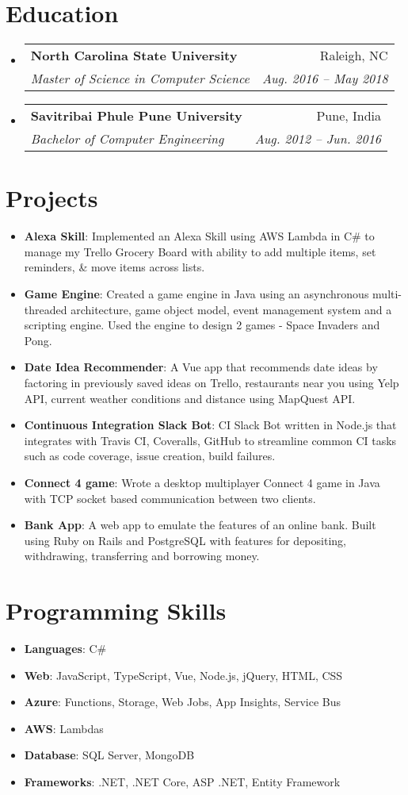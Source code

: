 \documentclass[letterpaper,11pt]{article}
\makeatletter
\newcommand{\resumeItem}[2]{
  \item\small{
    \textbf{#1}{: #2 \vspace{-2pt}}
  }
}
\newcommand{\resumeSubheading}[4]{
  \vspace{-1pt}\item
    \begin{tabular*}{0.97\textwidth}[t]{l@{\extracolsep{\fill}}r}
      \textbf{#1} & #2 \\
      \textit{\small#3} & \textit{\small #4} \\
    \end{tabular*}\vspace{-5pt}
}
\newcommand{\resumeSubItem}[2]{\resumeItem{#1}{#2}\vspace{-4pt}}
\newcommand{\resumeSubHeadingListStart}{\begin{itemize}[leftmargin=*]}
\newcommand{\resumeSubHeadingListEnd}{\end{itemize}}
\makeatother
\begin{document}
\section{Education}
  \resumeSubHeadingListStart
    \resumeSubheading
      {North Carolina State University}{Raleigh, NC}
      {Master of Science in Computer Science}{Aug. 2016 -- May 2018}
    \resumeSubheading
      {Savitribai Phule Pune University}{Pune, India}
      {Bachelor of Computer Engineering}{Aug. 2012 -- Jun. 2016}
  \resumeSubHeadingListEnd


\section{Projects}
  \resumeSubHeadingListStart
    \resumeSubItem{Alexa Skill}
      {Implemented an Alexa Skill using AWS Lambda in C\# to manage my Trello Grocery Board with ability to add multiple items, set reminders, \& move items across lists. }
    \resumeSubItem{Game Engine}
      {Created a game engine in Java using an asynchronous multi-threaded architecture, game object model, event management system and a scripting engine. Used the engine to design 2 games - Space Invaders and Pong.}
    \resumeSubItem{Date Idea Recommender}
      {A Vue app that recommends date ideas by factoring in previously saved ideas on Trello, restaurants near you using Yelp API, current weather conditions and distance using MapQuest API.}
    \resumeSubItem{Continuous Integration Slack Bot}
      {CI Slack Bot written in Node.js that integrates with Travis CI, Coveralls, GitHub to streamline common CI tasks such as code coverage, issue creation, build failures.}
    \resumeSubItem{Connect 4 game}
      {Wrote a desktop multiplayer Connect 4 game in Java with TCP socket based communication between two clients.}
    \resumeSubItem{Bank App}
      {A web app to emulate the features of an online bank. Built using Ruby on Rails and PostgreSQL with features for depositing, withdrawing, transferring and borrowing money.}
  \resumeSubHeadingListEnd

%
\section{Programming Skills}
  \resumeSubHeadingListStart
    \resumeSubItem{Languages}{C\#}
    \resumeSubItem{Web}{JavaScript, TypeScript, Vue, Node.js, jQuery, HTML, CSS}   
    \resumeSubItem{Azure}{Functions, Storage, Web Jobs, App Insights, Service Bus}
    \resumeSubItem{AWS}{Lambdas}
    \resumeSubItem{Database}{SQL Server, MongoDB}
    \resumeSubItem{Frameworks}{.NET, .NET Core, ASP .NET, Entity Framework}   
\resumeSubHeadingListEnd


\end{document}
